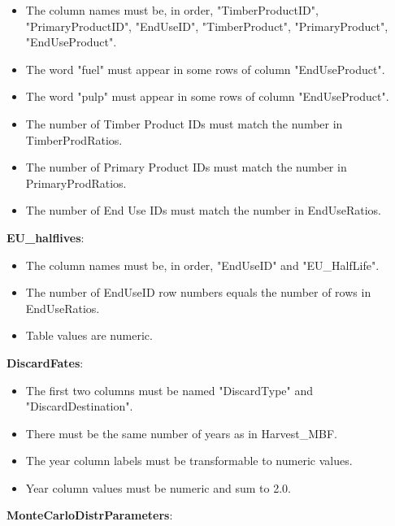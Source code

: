 \documentclass[
  openany]{book}
\providecommand{\tightlist}{%
  \setlength{\itemsep}{0pt}\setlength{\parskip}{0pt}}
\begin{document}
\begin{itemize}
\tightlist
\item
  The column names must be, in order, "TimberProductID", "PrimaryProductID", "EndUseID", "TimberProduct", "PrimaryProduct", "EndUseProduct".\\
\item
  The word "fuel" must appear in some rows of column "EndUseProduct".\\
\item
  The word "pulp" must appear in some rows of column "EndUseProduct".\\
\item
  The number of Timber Product IDs must match the number in TimberProdRatios.\\
\item
  The number of Primary Product IDs must match the number in PrimaryProdRatios.\\
\item
  The number of End Use IDs must match the number in EndUseRatios.
\end{itemize}

\textbf{EU\_halflives}:

\begin{itemize}
\tightlist
\item
  The column names must be, in order, "EndUseID" and "EU\_HalfLife".\\
\item
  The number of EndUseID row numbers equals the number of rows in EndUseRatios.\\
\item
  Table values are numeric.
\end{itemize}

\textbf{DiscardFates}:

\begin{itemize}
\tightlist
\item
  The first two columns must be named "DiscardType" and "DiscardDestination".\\
\item
  There must be the same number of years as in Harvest\_MBF.\\
\item
  The year column labels must be transformable to numeric values.\\
\item
  Year column values must be numeric and sum to 2.0.
\end{itemize}

\textbf{MonteCarloDistrParameters}:
\end{document}
